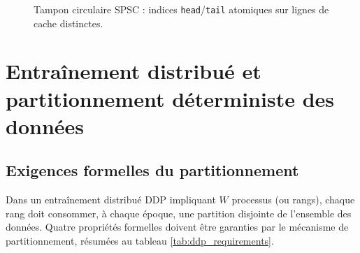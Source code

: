 \documentclass[12pt,a4paper]{report}
\begin{document}
\begin{figure}[htbp]
  \centering
  \vspace{0.3cm}
  \caption{Tampon circulaire SPSC : indices \texttt{head}/\texttt{tail} atomiques sur lignes de cache distinctes.}
  \label{fig:spsc}
\end{figure}

\section{Entraînement distribué et partitionnement déterministe des données}
\label{sec:distribue}

\subsection{Exigences formelles du partitionnement}

Dans un entraînement distribué DDP impliquant $W$ processus (ou rangs), chaque rang doit consommer, à chaque époque, une partition disjointe de l'ensemble des données. Quatre propriétés formelles doivent être garanties par le mécanisme de partitionnement, résumées au tableau \ref{tab:ddp_requirements}.
\end{document}
